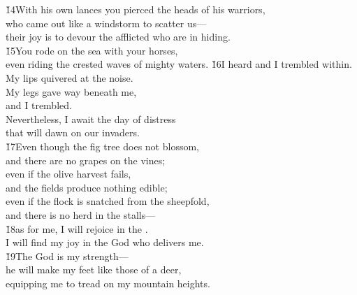\begin{poetry}
\poeml \v{14}With his own lances you pierced the heads of his warriors, \\
\poemll    who came out like a windstorm to scatter us--- \\
\poemlll       their joy is to devour the afflicted who are in hiding. \\
\poeml \v{15}You rode on the sea with your horses, \\
\poemll    even riding the crested waves of mighty waters.
\poeml \v{16}I heard and I trembled within. \\
\poemll    My lips quivered at the noise. \\
\poeml My legs gave way beneath me, \\
\poemll    and I trembled. \\
\poeml Nevertheless, I await the day of distress \\
\poemll    that will dawn on our invaders. \\
\poeml \v{17}Even though the fig tree does not blossom, \\
\poemll    and there are no grapes on the vines; \\
\poeml even if the olive harvest fails, \\
\poemll    and the fields produce nothing edible; \\
\poeml even if the flock is snatched from the sheepfold, \\
\poemll    and there is no herd in the stalls--- \\
\poeml \v{18}as for me, I will rejoice in the . \\
\poemll    I will find my joy in the God who delivers me. \\
\poeml \v{19}The  God is my strength--- \\
\poemll    he will make my feet like those of a deer, \\
\poemlll       equipping me to tread on my mountain heights.
\end{poetry}
